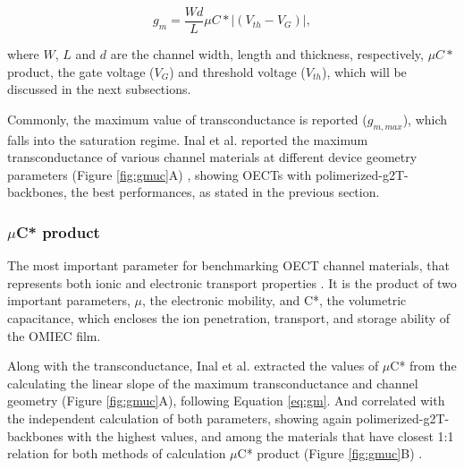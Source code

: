 \begin{equation}\label{eq:gm}
	g_{m} = \frac{Wd}{L} \mu C* |(V_{th} - V_{G})|,
\end{equation}

where $W$, $L$ and $d$ are the channel width, length and thickness, respectively, $\mu C*$ product, the gate voltage ($V_{G}$) and threshold voltage ($V_{th}$), which will be discussed in the next subsections.

Commonly, the maximum value of transconductance is reported ($g_{m,max}$), which falls into the saturation regime. Inal et al. reported the maximum transconductance of various channel materials at different device geometry parameters (Figure \ref{fig:gmuc}A) \cite{inalBenchmarkingOrganicMixed2017}, showing OECTs with polimerized-g2T-backbones, the best performances, as stated in the previous section.

\subsubsection{$\mu$C* product}

The most important parameter for benchmarking OECT channel materials, that represents both ionic and electronic transport properties %
\cite{inalBenchmarkingOrganicMixed2017}. %
It is the product of two important parameters, $\mu$, the electronic mobility, and C*, the volumetric capacitance, which encloses the ion penetration, transport, and storage ability of the OMIEC film.

Along with the transconductance, Inal et al. extracted the values of $\mu$C* from the calculating the linear slope of the maximum transconductance and channel geometry (Figure \ref{fig:gmuc}A), following Equation \ref{eq:gm}. And correlated with the independent calculation of both parameters, showing again polimerized-g2T-backbones with the highest values, and among the materials that have closest 1:1 relation for both methods of calculation $\mu$C* product (Figure \ref{fig:gmuc}B) \cite{inalBenchmarkingOrganicMixed2017}.
 
